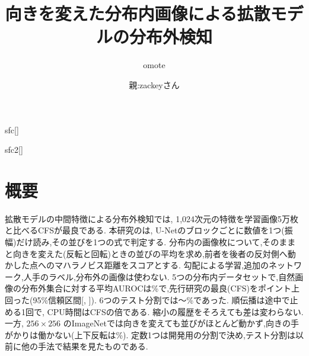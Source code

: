 
\title{\textbf{向きを変えた分布内画像による拡散モデルの分布外検知}}
\author{omote}{}{sfc}[]
\author{親:zackeyさん}{}{sfc2}[]
\maketitle

\section*{概要}
拡散モデルの中間特徴による分布外検知では, 1{,}024次元の特徴を学習画像5万枚と比べるCFSが最良である. 本研究の\Ours{}は, U-Netのブロックごとに数値を1つ(振幅)だけ読み,その並びを1つの式で判定する. 分布内の画像\olNRefMax{}枚について,そのままと向きを変えた(反転と回転)ときの並びの平均を求め,前者を後者の反対側へ動かした点へのマハラノビス距離をスコアとする. 勾配による学習,追加のネットワーク,人手のラベル,分布外の画像は使わない. 5つの分布内データセットで,自然画像の分布外集合に対する平均AUROCは\olTestOL\%で,先行研究の最良(CFS)を\olGapCfsKnn{}ポイント上回った(95\%信頼区間[\olGapCfsKnnLo, \olGapCfsKnnHi]). 6つのテスト分割では\olSixMin{}〜\olSixMax\%であった. 順伝播は途中で止める1回で, CPU時間はCFSの\olSecRatioCfsKnn{}倍である. 縮小の履歴をそろえても差は変わらない. 一方, $256{\times}256$ のImageNetでは向きを変えても並びがほとんど動かず,向きの手がかりは働かない(上下反転は\olHrOLVf\%). 定数1つは開発用の分割で決め,テスト分割は以前に他の手法で結果を見たものである.

